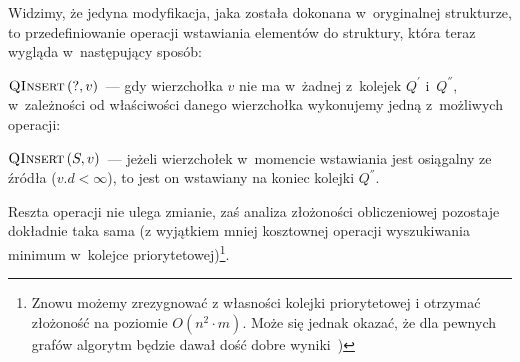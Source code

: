 Widzimy, że jedyna modyfikacja, jaka została dokonana w~oryginalnej strukturze, to przedefiniowanie operacji wstawiania elementów do struktury, która teraz wygląda w~następujący sposób:

\begin{myitemize}
	\item $\textrm{\textsc{QInsert}} \left( ?, v \right)$~--- gdy wierzchołka $v$ nie ma w~żadnej z~kolejek $Q^{'}$ i~$Q^{''}$, w~zależności od właściwości danego wierzchołka wykonujemy jedną z~możliwych operacji:
	\begin{myitemize}
		\item $\textrm{\textsc{QInsert}} \left( S, v \right) $~--- jeżeli wierzchołek w~momencie wstawiania jest osiągalny ze źródła ($v.d < \infty$), to jest on wstawiany na koniec kolejki $Q^{''}$.
	\end{myitemize}
\end{myitemize}

Reszta operacji nie ulega zmianie, zaś analiza złożoności obliczeniowej pozostaje dokładnie taka sama (z wyjątkiem mniej kosztownej operacji wyszukiwania minimum w~kolejce priorytetowej)\footnote{
	Znowu możemy zrezygnować z własności kolejki priorytetowej i otrzymać złożoność na poziomie $O \left( n^{2} \cdot m \right)$.
	Może się jednak okazać, że dla pewnych grafów algorytm będzie dawał dość dobre wyniki~\cite[$3.10.2$]{Dissertation})
}.

